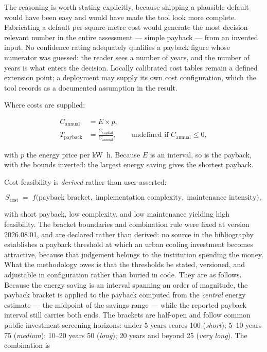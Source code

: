The reasoning is worth stating explicitly, because shipping a plausible default
would have been easy and would have made the tool look more complete.
Fabricating a default per-square-metre cost would generate the most
decision-relevant number in the entire assessment --- simple payback --- from
an invented input. No confidence rating adequately qualifies a payback figure
whose numerator was guessed: the reader sees a number of years, and the number
of years is what enters the decision. Locally calibrated cost tables remain a
defined extension point; a deployment may supply its own cost configuration,
which the tool records as a documented assumption in the result.

Where costs are supplied:

\begin{align}
\label{eq:annual-savings}
C_{\mathrm{annual}} &= E \times p, \\
\label{eq:payback}
T_{\mathrm{payback}} &= \frac{C_{\mathrm{capital}}}{C_{\mathrm{annual}}},
\qquad \text{undefined if } C_{\mathrm{annual}} \le 0,
\end{align}

with $p$ the energy price per \unit{\kilo\watt\hour}. Because $E$ is an
interval, so is the payback, with the bounds inverted: the largest energy
saving gives the shortest payback.

Cost feasibility is \emph{derived} rather than user-asserted:

\begin{equation}
\label{eq:cost-feasibility}
S_{\mathrm{cost}} \;=\; f\bigl(\text{payback bracket},\;
\text{implementation complexity},\; \text{maintenance intensity}\bigr),
\end{equation}

with short payback, low complexity, and low maintenance yielding high
feasibility. The bracket boundaries and combination rule were fixed at version
2026.08.01, and are declared rather than derived: no source in the
bibliography establishes a payback threshold at which an urban cooling
investment becomes attractive, because that judgement belongs to the
institution spending the money. What the methodology owes is that the
thresholds be stated, versioned, and adjustable in configuration rather than
buried in code. They are as follows. Because the energy saving is an
interval spanning an order of magnitude, the payback bracket is applied to the
payback computed from the \emph{central} energy estimate --- the midpoint of
the savings range --- while the reported payback interval still carries both
ends. The brackets are half-open and follow common public-investment screening
horizons: under 5 years scores 100 (\emph{short}); 5--10 years 75
(\emph{medium}); 10--20 years 50 (\emph{long}); 20 years and beyond 25
(\emph{very long}). The combination is

